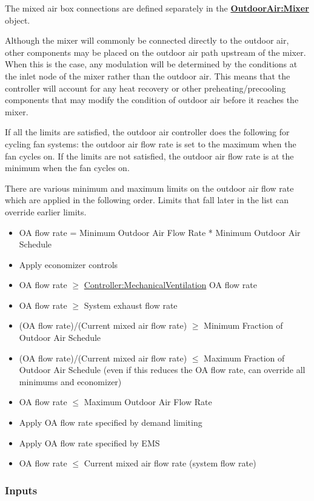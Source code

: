 The mixed air box connections are defined separately in the \textbf{\hyperref[outdoorairmixer]{OutdoorAir:Mixer}} object.

Although the mixer will commonly be connected directly to the outdoor air, other components may be placed on the outdoor air path upstream of the mixer. When this is the case, any modulation will be determined by the conditions at the inlet node of the mixer rather than the outdoor air. This means that the controller will account for any heat recovery or other preheating/precooling components that may modify the condition of outdoor air before it reaches the mixer.

If all the limits are satisfied, the outdoor air controller does the following for cycling fan systems: the outdoor air flow rate is set to the maximum when the fan cycles on. If the limits are not satisfied, the outdoor air flow rate is at the minimum when the fan cycles on.

There are various minimum and maximum limits on the outdoor air flow rate which are applied in the following order. Limits that fall later in the list can override earlier limits.

\begin{itemize}
\tightlist
\item  OA flow rate = Minimum Outdoor Air Flow Rate * Minimum Outdoor Air Schedule
\item  Apply economizer controls
\item  OA flow rate \(\ge\) \hyperref[controllermechanicalventilation]{Controller:MechanicalVentilation} OA flow rate
\item  OA flow rate \(\ge\) System exhaust flow rate
\item  (OA flow rate)/(Current mixed air flow rate) \(\ge\) Minimum Fraction of Outdoor Air Schedule
\item  (OA flow rate)/(Current mixed air flow rate) \(\le\) Maximum Fraction of Outdoor Air Schedule (even if this reduces the OA flow rate, can override all minimums and economizer)
\item  OA flow rate \(\le\) Maximum Outdoor Air Flow Rate
\item  Apply OA flow rate specified by demand limiting
\item  Apply OA flow rate specified by EMS
\item  OA flow rate \(\le\) Current mixed air flow rate (system flow rate)
\end{itemize}

\subsubsection{Inputs}\label{inputs-1-007}

